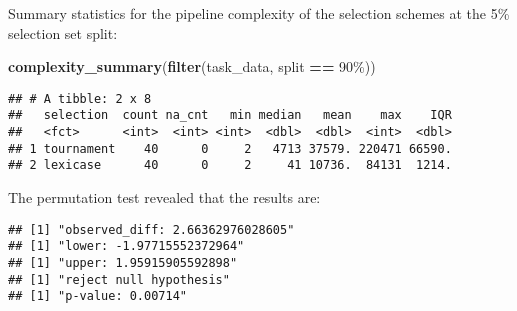 \documentclass[
]{book}
\newenvironment{Shaded}{\begin{snugshade}}{\end{snugshade}}
\newcommand{\AttributeTok}[1]{\textcolor[rgb]{0.13,0.29,0.53}{#1}}
\newcommand{\DecValTok}[1]{\textcolor[rgb]{0.00,0.00,0.81}{#1}}
\newcommand{\FunctionTok}[1]{\textcolor[rgb]{0.13,0.29,0.53}{\textbf{#1}}}
\newcommand{\NormalTok}[1]{#1}
\newcommand{\OtherTok}[1]{\textcolor[rgb]{0.56,0.35,0.01}{#1}}
\newcommand{\SpecialCharTok}[1]{\textcolor[rgb]{0.81,0.36,0.00}{\textbf{#1}}}
\newcommand{\StringTok}[1]{\textcolor[rgb]{0.31,0.60,0.02}{#1}}
\begin{document}
Summary statistics for the pipeline complexity of the selection schemes at the 5\% selection set split:

\begin{Shaded}
\begin{Highlighting}[]
\FunctionTok{complexity\_summary}\NormalTok{(}\FunctionTok{filter}\NormalTok{(task\_data, split }\SpecialCharTok{==} \StringTok{\textquotesingle{}90\%\textquotesingle{}}\NormalTok{))}
\end{Highlighting}
\end{Shaded}

\begin{verbatim}
## # A tibble: 2 x 8
##   selection  count na_cnt   min median   mean    max    IQR
##   <fct>      <int>  <int> <int>  <dbl>  <dbl>  <int>  <dbl>
## 1 tournament    40      0     2   4713 37579. 220471 66590.
## 2 lexicase      40      0     2     41 10736.  84131  1214.
\end{verbatim}

The permutation test revealed that the results are:

\begin{Shaded}
\end{Shaded}

\begin{verbatim}
## [1] "observed_diff: 2.66362976028605"
## [1] "lower: -1.97715552372964"
## [1] "upper: 1.95915905592898"
## [1] "reject null hypothesis"
## [1] "p-value: 0.00714"
\end{verbatim}
\end{document}
